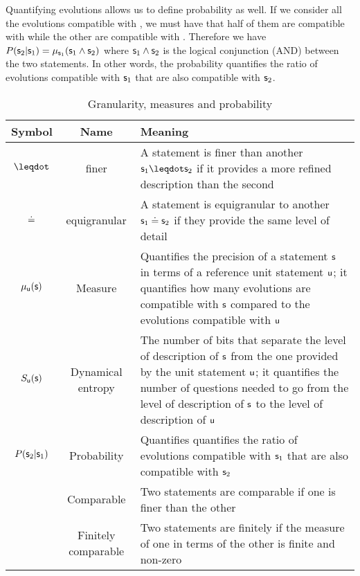 \documentclass[letterpaper]{article}
\begin{document}
Quantifying evolutions allows us to define probability as well. If we consider all the evolutions compatible with , we must have that half of them are compatible with  while the other are compatible with .  Therefore we have $P(\stmt_2 | \stmt_1) = \mu_{\stmt_1}(\stmt_1 \AND \stmt_2)$ where $\stmt_1 \AND \stmt_2$ is the logical conjunction (AND) between the two statements. In other words, the probability quantifies the ratio of evolutions compatible with $\stmt_1$ that are also compatible with $\stmt_2$.


\begin{table}[h!]
	\centering
	\begin{tabular}[h]{|c|c|p{6cm}|}
		\hline 
		Symbol & Name & Meaning \\ 
		\hline 
		$\finer$ & finer & A statement is finer than another $\stmt_1 \finer \stmt_2$ if it provides a more refined description than the second \\ 
		\hline 
		$\eqgran$ & equigranular & A statement is equigranular to another $\stmt_1 \eqgran \stmt_2$ if they provide the same level of detail \\ 
		\hline 
		$\mu_{\stmt[u]}(\stmt)$ & Measure & Quantifies the precision of a statement $\stmt$ in terms of a reference unit statement $\stmt[u]$; it quantifies how many evolutions are compatible with $\stmt$ compared to the evolutions compatible with $\stmt[u]$  \\ 
		\hline 
		$S_{\stmt[u]}(\stmt)$ & Dynamical entropy & The number of bits that separate the level of description of $\stmt$ from the one provided by the unit statement $\stmt[u]$; it quantifies the number of questions needed to go from the level of description of $\stmt$ to the level of description of $\stmt[u]$  \\ 
		\hline 
		$P(\stmt_2 | \stmt_1)$ & Probability & Quantifies quantifies the ratio of evolutions compatible with $\stmt_1$ that are also compatible with $\stmt_2$  \\ 
		\hline 
		 & Comparable & Two statements are comparable if one is finer than the other \\ 
		\hline 
		 & Finitely comparable & Two statements are finitely if the measure of one in terms of the other is finite and non-zero \\ 
		\hline 
	\end{tabular} 
	\caption{Granularity, measures and probability}
	\label{table:states}
\end{table}
\end{document}
